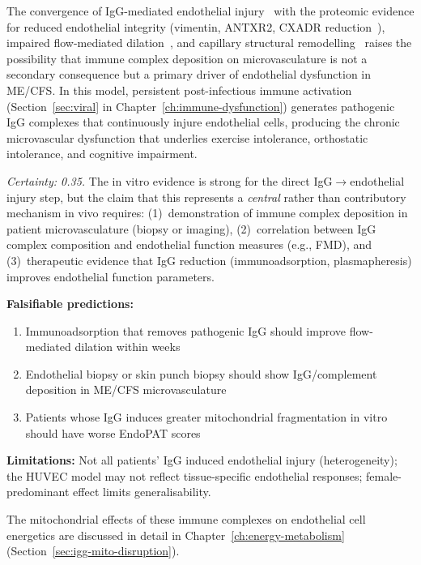 \begin{speculation}
\label{spec:igg-endothelial-central}
The convergence of IgG-mediated endothelial injury~\cite{Liu2026IgGcomplexes} with the proteomic evidence for reduced endothelial integrity (vimentin, ANTXR2, CXADR reduction~\cite{Hoel2026proteome}), impaired flow-mediated dilation~\cite{Scherbakov2020,Haffke2023fmd}, and capillary structural remodelling~\cite{Wust2024capillary} raises the possibility that immune complex deposition on microvasculature is not a secondary consequence but a primary driver of endothelial dysfunction in ME/CFS. In this model, persistent post-infectious immune activation (Section~\ref{sec:viral} in Chapter~\ref{ch:immune-dysfunction}) generates pathogenic IgG complexes that continuously injure endothelial cells, producing the chronic microvascular dysfunction that underlies exercise intolerance, orthostatic intolerance, and cognitive impairment.

\textit{Certainty: 0.35.} The in vitro evidence is strong for the direct IgG$\to$endothelial injury step, but the claim that this represents a \emph{central} rather than contributory mechanism in vivo requires: (1)~demonstration of immune complex deposition in patient microvasculature (biopsy or imaging), (2)~correlation between IgG complex composition and endothelial function measures (e.g., FMD), and (3)~therapeutic evidence that IgG reduction (immunoadsorption, plasmapheresis) improves endothelial function parameters.

\textbf{Falsifiable predictions:}
\begin{enumerate}
    \item Immunoadsorption that removes pathogenic IgG should improve flow-mediated dilation within weeks
    \item Endothelial biopsy or skin punch biopsy should show IgG/complement deposition in ME/CFS microvasculature
    \item Patients whose IgG induces greater mitochondrial fragmentation in vitro should have worse EndoPAT scores
\end{enumerate}

\textbf{Limitations:} Not all patients' IgG induced endothelial injury (heterogeneity); the HUVEC model may not reflect tissue-specific endothelial responses; female-predominant effect limits generalisability.
\end{speculation}

The mitochondrial effects of these immune complexes on endothelial cell energetics are discussed in detail in Chapter~\ref{ch:energy-metabolism} (Section~\ref{sec:igg-mito-disruption}).

